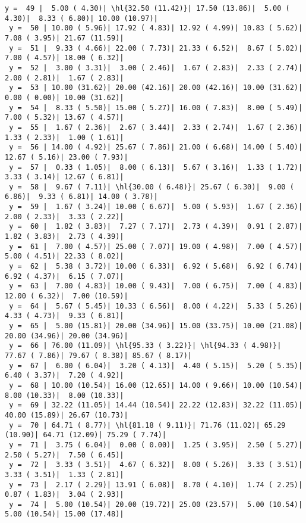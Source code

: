 \documentclass[10pt]{article}
\newcommand{\hl}[1]{\textbf{\textcolor{red}{#1}}}
\begin{document}
\begin{Verbatim}[fontsize=\small, commandchars=\\\{\}]
 y =  49 |  5.00 ( 4.30)| \hl{32.50 (11.42)}| 17.50 (13.86)|  5.00 ( 4.30)|  8.33 ( 6.80)| 10.00 (10.97)|
 y =  50 | 10.00 ( 5.96)| 17.92 ( 4.83)| 12.92 ( 4.99)| 10.83 ( 5.62)|  7.08 ( 3.95)| 21.67 (11.59)|
 y =  51 |  9.33 ( 4.66)| 22.00 ( 7.73)| 21.33 ( 6.52)|  8.67 ( 5.02)|  7.00 ( 4.57)| 18.00 ( 6.32)|
 y =  52 |  3.00 ( 3.31)|  3.00 ( 2.46)|  1.67 ( 2.83)|  2.33 ( 2.74)|  2.00 ( 2.81)|  1.67 ( 2.83)|
 y =  53 | 10.00 (31.62)| 20.00 (42.16)| 20.00 (42.16)| 10.00 (31.62)|  0.00 ( 0.00)| 10.00 (31.62)|
 y =  54 |  8.33 ( 5.50)| 15.00 ( 5.27)| 16.00 ( 7.83)|  8.00 ( 5.49)|  7.00 ( 5.32)| 13.67 ( 4.57)|
 y =  55 |  1.67 ( 2.36)|  2.67 ( 3.44)|  2.33 ( 2.74)|  1.67 ( 2.36)|  1.33 ( 2.33)|  1.00 ( 1.61)|
 y =  56 | 14.00 ( 4.92)| 25.67 ( 7.86)| 21.00 ( 6.68)| 14.00 ( 5.40)| 12.67 ( 5.16)| 23.00 ( 7.93)|
 y =  57 |  0.33 ( 1.05)|  8.00 ( 6.13)|  5.67 ( 3.16)|  1.33 ( 1.72)|  3.33 ( 3.14)| 12.67 ( 6.81)|
 y =  58 |  9.67 ( 7.11)| \hl{30.00 ( 6.48)}| 25.67 ( 6.30)|  9.00 ( 6.86)|  9.33 ( 6.81)| 14.00 ( 3.78)|
 y =  59 |  1.67 ( 3.24)| 10.00 ( 6.67)|  5.00 ( 5.93)|  1.67 ( 2.36)|  2.00 ( 2.33)|  3.33 ( 2.22)|
 y =  60 |  1.82 ( 3.83)|  7.27 ( 7.17)|  2.73 ( 4.39)|  0.91 ( 2.87)|  1.82 ( 3.83)|  2.73 ( 4.39)|
 y =  61 |  7.00 ( 4.57)| 25.00 ( 7.07)| 19.00 ( 4.98)|  7.00 ( 4.57)|  5.00 ( 4.51)| 22.33 ( 8.02)|
 y =  62 |  5.38 ( 3.72)| 10.00 ( 6.33)|  6.92 ( 5.68)|  6.92 ( 6.74)|  6.92 ( 4.37)|  6.15 ( 7.07)|
 y =  63 |  7.00 ( 4.83)| 10.00 ( 9.43)|  7.00 ( 6.75)|  7.00 ( 4.83)| 12.00 ( 6.32)|  7.00 (10.59)|
 y =  64 |  5.67 ( 5.45)| 10.33 ( 6.56)|  8.00 ( 4.22)|  5.33 ( 5.26)|  4.33 ( 4.73)|  9.33 ( 6.81)|
 y =  65 |  5.00 (15.81)| 20.00 (34.96)| 15.00 (33.75)| 10.00 (21.08)| 20.00 (34.96)| 20.00 (34.96)|
 y =  66 | 76.00 (11.09)| \hl{95.33 ( 3.22)}| \hl{94.33 ( 4.98)}| 77.67 ( 7.86)| 79.67 ( 8.38)| 85.67 ( 8.17)|
 y =  67 |  6.00 ( 6.04)|  3.20 ( 4.13)|  4.40 ( 5.15)|  5.20 ( 5.35)|  6.40 ( 3.37)|  7.20 ( 4.92)|
 y =  68 | 10.00 (10.54)| 16.00 (12.65)| 14.00 ( 9.66)| 10.00 (10.54)|  8.00 (10.33)|  8.00 (10.33)|
 y =  69 | 32.22 (11.05)| 14.44 (10.54)| 22.22 (12.83)| 32.22 (11.05)| 40.00 (15.89)| 26.67 (10.73)|
 y =  70 | 64.71 ( 8.77)| \hl{81.18 ( 9.11)}| 71.76 (11.02)| 65.29 (10.90)| 64.71 (12.09)| 75.29 ( 7.74)|
 y =  71 |  3.75 ( 6.04)|  0.00 ( 0.00)|  1.25 ( 3.95)|  2.50 ( 5.27)|  2.50 ( 5.27)|  7.50 ( 6.45)|
 y =  72 |  3.33 ( 3.51)|  4.67 ( 6.32)|  8.00 ( 5.26)|  3.33 ( 3.51)|  3.33 ( 3.51)|  1.33 ( 2.81)|
 y =  73 |  2.17 ( 2.29)| 13.91 ( 6.08)|  8.70 ( 4.10)|  1.74 ( 2.25)|  0.87 ( 1.83)|  3.04 ( 2.93)|
 y =  74 |  5.00 (10.54)| 20.00 (19.72)| 25.00 (23.57)|  5.00 (10.54)|  5.00 (10.54)| 15.00 (17.48)|

\end{Verbatim}
\end{document}
